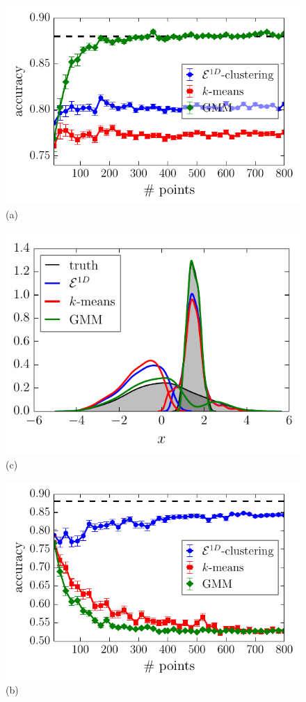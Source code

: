 \documentclass[aps,preprint,nofootinbib,floatfix]{revtex4-1}
\begin{document}
\begin{figure}
\begin{minipage}{0.49\textwidth}
\includegraphics[width=\textwidth]{1D_normal.pdf}\\[-1em](a)\\
~~~~~\includegraphics[width=.9\textwidth]{normal_density.pdf}\\[-1.5em](c)
\end{minipage}
\begin{minipage}{0.49\textwidth}
\includegraphics[width=\textwidth]{1D_lognormal.pdf}\\[-1em](b)\\

\end{minipage}
\end{figure}
\end{document}
